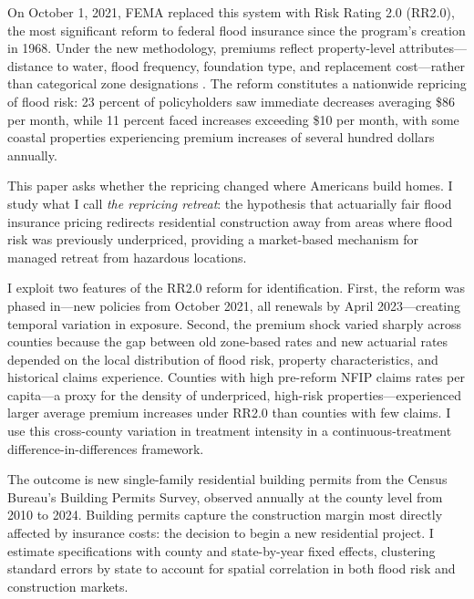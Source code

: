 \documentclass[12pt]{article}
\begin{document}
On October 1, 2021, FEMA replaced this system with Risk Rating 2.0 (RR2.0), the most significant reform to federal flood insurance since the program's creation in 1968. Under the new methodology, premiums reflect property-level attributes---distance to water, flood frequency, foundation type, and replacement cost---rather than categorical zone designations \citep{fema2021rr2}. The reform constitutes a nationwide repricing of flood risk: 23 percent of policyholders saw immediate decreases averaging \$86 per month, while 11 percent faced increases exceeding \$10 per month, with some coastal properties experiencing premium increases of several hundred dollars annually.

This paper asks whether the repricing changed where Americans build homes. I study what I call \textit{the repricing retreat}: the hypothesis that actuarially fair flood insurance pricing redirects residential construction away from areas where flood risk was previously underpriced, providing a market-based mechanism for managed retreat from hazardous locations.

I exploit two features of the RR2.0 reform for identification. First, the reform was phased in---new policies from October 2021, all renewals by April 2023---creating temporal variation in exposure. Second, the premium shock varied sharply across counties because the gap between old zone-based rates and new actuarial rates depended on the local distribution of flood risk, property characteristics, and historical claims experience. Counties with high pre-reform NFIP claims rates per capita---a proxy for the density of underpriced, high-risk properties---experienced larger average premium increases under RR2.0 than counties with few claims. I use this cross-county variation in treatment intensity in a continuous-treatment difference-in-differences framework.

The outcome is new single-family residential building permits from the Census Bureau's Building Permits Survey, observed annually at the county level from 2010 to 2024. Building permits capture the construction margin most directly affected by insurance costs: the decision to begin a new residential project. I estimate specifications with county and state-by-year fixed effects, clustering standard errors by state to account for spatial correlation in both flood risk and construction markets.
\end{document}
